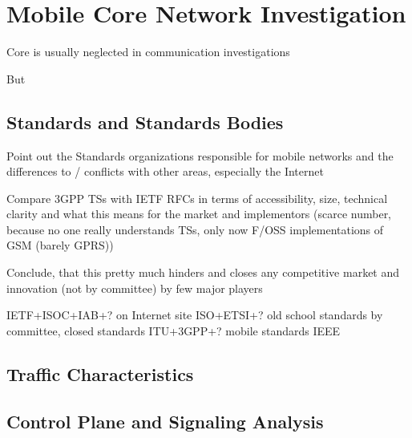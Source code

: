 \chapter{Mobile Core Network Investigation}
\label{chap:mobilenets}

Core is usually neglected in communication investigations

But 

\section{Standards and Standards Bodies}

Point out the Standards organizations responsible for mobile networks and the differences to / conflicts with other areas, especially the Internet

Compare 3GPP TSs with IETF RFCs in terms of accessibility, size, technical clarity and what this means for the market and implementors (scarce number, because no one really understands TSs, only now F/OSS implementations of GSM (barely GPRS))

Conclude, that this pretty much hinders and closes any competitive market and innovation (not by committee) by few major players

IETF+ISOC+IAB+? on Internet site
ISO+ETSI+? old school standards by committee, closed standards
ITU+3GPP+? mobile standards
IEEE








\section{Traffic Characteristics}



\section{Control Plane and Signaling Analysis}
